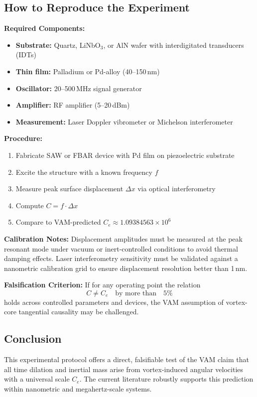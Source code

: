 \documentclass[12pt]{article}
\begin{document}
    \subsection*{How to Reproduce the Experiment}

    \textbf{Required Components:}
    \begin{itemize}
        \item \textbf{Substrate:} Quartz, LiNbO$_3$, or AlN wafer with interdigitated transducers (IDTs)
        \item \textbf{Thin film:} Palladium or Pd-alloy (40--150\,nm)
        \item \textbf{Oscillator:} 20--500\,MHz signal generator
        \item \textbf{Amplifier:} RF amplifier (5--20\,dBm)
        \item \textbf{Measurement:} Laser Doppler vibrometer or Michelson interferometer
    \end{itemize}

    \textbf{Procedure:}
    \begin{enumerate}
        \item Fabricate SAW or FBAR device with Pd film on piezoelectric substrate
        \item Excite the structure with a known frequency $f$
        \item Measure peak surface displacement $\Delta x$ via optical interferometry
        \item Compute $C = f \cdot \Delta x$
        \item Compare to VAM-predicted $C_e \approx 1.09384563 \times 10^6$\,
    \end{enumerate}

    \textbf{Calibration Notes:} Displacement amplitudes must be measured at the peak resonant mode under vacuum or inert-controlled conditions to avoid thermal damping effects. Laser interferometry sensitivity must be validated against a nanometric calibration grid to ensure displacement resolution better than 1\,nm.

    \textbf{Falsification Criterion:} If for any operating point the relation
    \[
        C \ne C_e \quad \text{by more than} \quad 5\%
    \]
    holds across controlled parameters and devices, the VAM assumption of vortex-core tangential causality may be challenged.

    \subsection*{Conclusion}
    This experimental protocol offers a direct, falsifiable test of the VAM claim that all time dilation and inertial mass arise from vortex-induced angular velocities with a universal scale $C_e$. The current literature robustly supports this prediction within nanometric and megahertz-scale systems.
\end{document}
